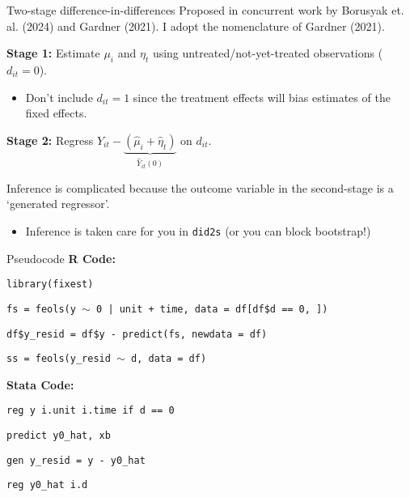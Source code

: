 \documentclass[t]{beamer}
\begin{document}
\begin{frame}{Two-stage difference-in-differences}
  Proposed in concurrent work by Borusyak et. al. (2024) and Gardner (2021). I adopt the nomenclature of Gardner (2021).

  \bigskip
  \textbf{Stage 1:}
  Estimate $\mu_i$ and $\eta_t$ using untreated/not-yet-treated observations ($d_{it} = 0$). 
  \pause
  \begin{itemize}
    \item Don't include $d_{it} = 1$ since the treatment effects will bias estimates of the fixed effects.
  \end{itemize}

  \bigskip
  \textbf{Stage 2:}
  Regress $Y_{it} - \underbrace{\left( \hat{\mu}_i + \hat{\eta}_t \right)}_{\hat{Y}_{it}(0)}$ on $d_{it}$.

  \pause
  \bigskip
  Inference is complicated because the outcome variable in the second-stage is a `generated regressor'. 
  \begin{itemize}
    \item Inference is taken care for you in \texttt{did2s} (or you can block bootstrap!)
  \end{itemize}
\end{frame}

\begin{frame}{Pseudocode}
  \textbf{R Code:}
  \medskip
  
  \texttt{library(fixest)}

  \texttt{fs = feols(y $\sim$ 0 | unit + time, data = df[df\$d == 0, ])}

  \texttt{df\$y\_resid = df\$y - predict(fs, newdata = df)}

  \texttt{ss = feols(y\_resid $\sim$ d, data = df)}


  \bigskip\bigskip
  \textbf{Stata Code:}
  \medskip

  \texttt{reg y i.unit i.time if d == 0}

  \texttt{predict y0\_hat, xb}

  \texttt{gen y\_resid = y - y0\_hat}

  \texttt{reg y0\_hat i.d}
\end{frame}
\end{document}
